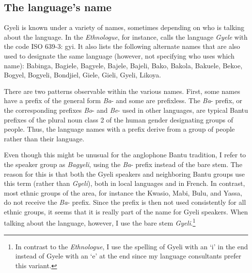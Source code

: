 \subsection{The language's name}
\label{sec:name}

Gyeli is known under a variety of names, sometimes depending on who is talking about the language. In the \textit{Ethnologue}, for instance, \citet{lewis09} calls the language \textit{Gyele} with the code ISO 639-3: gyi. It also lists the following alternate names that are also used to designate the same language (however, not specifying who uses which name): Babinga, Bagiele, Bagyele, Bajele, Bajeli, Bako, Bakola, Bakuele, Bekoe, Bogyel, Bogyeli, Bondjiel, Giele, Gieli, Gyeli, Likoya.

There are two patterns observable within the various names. First, some names have a prefix of the general form \textit{Ba}- and some are prefixless.
The \textit{Ba}- prefix, or the corresponding prefixes \textit{Bo}- and \textit{Be}- used in other languages, are typical Bantu prefixes of the plural noun class 2 of the human gender designating groups of people. Thus, the language names with a prefix derive from a group of people rather than their language. 

Even though this might be unusual for the anglophone Bantu tradition, I refer to the speaker group as {\itshape Bagyeli}, using the {\itshape Ba}- prefix instead of the bare stem. The reason for this is that both the Gyeli speakers and neighboring Bantu groups use this term (rather than {\itshape Gyeli}), both in local languages and in French. In contrast, most ethnic groups of the area, for instance the Kwasio, Mabi, Bulu, and Yassa, do not receive  the {\itshape Ba}- prefix. Since the prefix is then not used consistently for all ethnic groups, it seems that it is really part of the name for Gyeli speakers. When talking about the language, however, I use the bare stem {\itshape Gyeli}.\footnote{In contrast to the \textit{Ethnologue}, I use the spelling of Gyeli with an `i' in the end instead of Gyele with an `e' at the end since my language consultants prefer this variant.}

